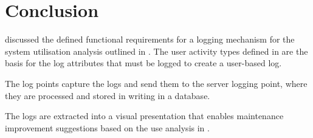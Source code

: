 \section{Conclusion}
 discussed the defined functional requirements for a logging mechanism for the system utilisation analysis outlined in . The user activity types defined in  are the basis for the log attributes that must be logged to create a user-based log. \par The log points capture the logs and send them to the server logging point, where they are processed and stored in writing in a database.\par The logs are extracted into a visual presentation that enables maintenance improvement suggestions based on the use analysis in .